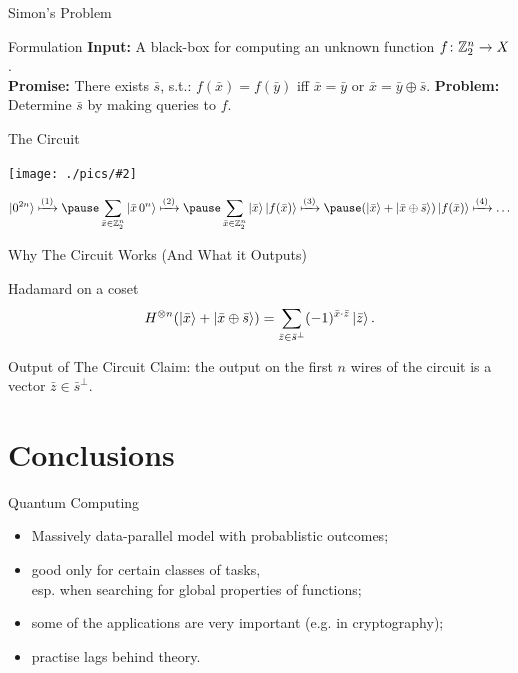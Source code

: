 \documentclass[
handout,
ignorenonframetext,hyperref={pdftex,unicode},xcolor=dvipsnames]{beamer}
\newcommand{\screenshotw}[2]{
\begin{center} 
\texttt{[image: ./pics/\#2]}
\end{center}
}
\begin{document}
\begin{frame}{Simon's Problem}

  \begin{block}{Formulation}
  \textbf{Input:} A black-box for computing an unknown function $f\colon \mathbb Z^n_2 \to X$.\\
  \textbf{Promise:} There exists $\bar s$, s.t.: $f(\bar x) = f(\bar y)$ iff $\bar x = \bar y$
  or $\bar x = \bar y \oplus \bar s$.
  \textbf{Problem:} Determine $\bar s$ by making queries to $f$.
  \end{block}

  \pause
  \begin{block}{The Circuit}
  \screenshotw{9cm}{simon.pdf}
  
  \pause
  \vspace{-1cm}
  \[
      \ket {0^{2n}} 
        \xmapsto{(1)} \pause
          \sum_{\bar x \in \Z^n_2} \ket {\bar x \,0^n}
        \xmapsto{(2)} \pause
          \sum_{\bar x \in \Z^n_2} 
            \ket {\bar x} \ket{f(\bar x)}
        \xmapsto{(3)} \pause %
          (\ket {\bar x} + \ket {\bar x \oplus \bar s}) \ket{f(\bar x)}
        \xmapsto{(4)} \ldots
  \]
  \end{block}

\end{frame}


\begin{frame}{Why The Circuit Works (And What it Outputs)}

  \begin{block}{Hadamard on a coset}
  \[
    H^{\otimes n}(\ket{\bar x} + \ket{\bar x \oplus \bar s}  ) =
      \sum_{\bar z \in {\bar s}^\perp} (-1)^{\bar x \cdot \bar z} \ket{\bar z}.
  \]
  \end{block}

  \pause
  \begin{block}{Output of The Circuit}
  Claim: the output on the first $n$ wires of the circuit is a vector $\bar z \in {\bar s}^\perp$.
  \end{block}
  
\end{frame}

\section{Conclusions}

\begin{frame}{Quantum Computing}

\begin{itemize}[<+->]
\item Massively data-parallel model with probablistic outcomes;
\item good only for certain classes of tasks,\\
      esp. when searching for global properties of functions;
\item some of the applications are very important (e.g. in cryptography);
\item practise lags behind theory.
\end{itemize}

\end{frame}
\end{document}
